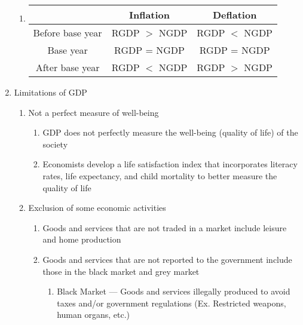 \documentclass[12pt]{article}
\begin{document}
\begin{enumerate}
\begin{enumerate}
          \item \begin{tabular}{| c | c | c |} \hline & Inflation & Deflation\\ \hline Before base year & RGDP $>$ NGDP & RGDP $<$ NGDP\\ \hline Base year & RGDP = NGDP & RGDP = NGDP\\ \hline After base year & RGDP $<$ NGDP & RGDP $>$ NGDP\\\hline  \end{tabular}

        \end{enumerate}

      \item Limitations of GDP

        \begin{enumerate}

          \item Not a perfect measure of well-being

            \begin{enumerate}

              \item GDP does not perfectly measure the well-being (quality of life) of the society

              \item Economists develop a life satisfaction index that incorporates literacy rates, life expectancy, and child mortality to better measure the quality of life

            \end{enumerate}

          \item Exclusion of some economic activities

            \begin{enumerate}

              \item Goods and services that are not traded in a market include leisure and home production

              \item Goods and services that are not reported to the government include those in the black market and grey market

                \begin{enumerate}

                  \item Black Market — Goods and services illegally produced to avoid taxes and/or government regulations (Ex. Restricted weapons, human organs, etc.)


\end{enumerate}
\end{enumerate}
\end{enumerate}
\end{enumerate}
\end{document}
